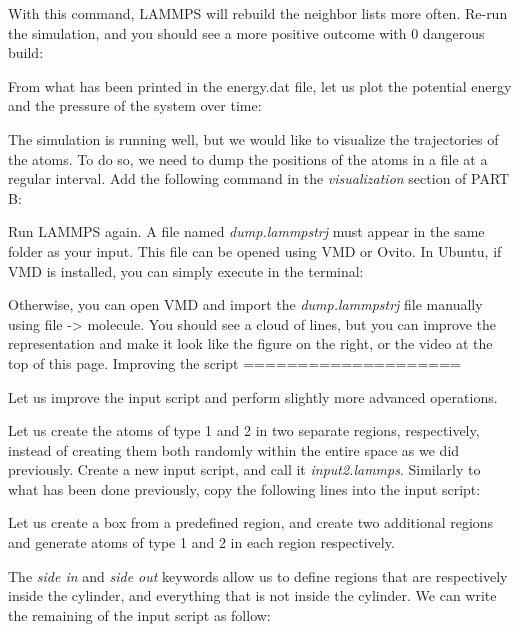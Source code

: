 \vspace{0.5cm} \noindent With this command, LAMMPS will rebuild the neighbor lists
more often. Re-run the simulation, and you should see a more
positive outcome with 0 dangerous build:

\vspace{0.5cm} \noindent From what has been printed in the energy.dat file, let us
plot the potential energy and the pressure of
the system over time:

\vspace{0.5cm} \noindent The simulation is running well, but we would like to
visualize the trajectories of the atoms. To do so, we need
to dump the positions of the atoms in a file at a regular
interval. Add the following command in the \textit{visualization}
section of PART B:

\vspace{0.5cm} \noindent Run LAMMPS again. A file named \textit{dump.lammpstrj} must appear in
the same folder as your input. This file can be opened using
VMD or Ovito. In Ubuntu, if VMD is installed, you can simply
execute in the terminal:

\vspace{0.5cm} \noindent Otherwise, you can open VMD and import the \textit{dump.lammpstrj}
file manually using file -> molecule. You should see a cloud
of lines, but you can improve the representation and make it
look like the figure on the right, or the video at the 
top of this page. 
Improving the script
====================

\vspace{0.5cm} \noindent Let us improve the input script and perform slightly more
advanced operations.

\vspace{0.5cm} \noindent Let us create the atoms of type 1 and 2 in two separate
regions, respectively, instead of creating them both randomly 
within the entire space as we did previously. Create a new input script, and call
it \textit{input2.lammps}. Similarly to what has been done previously, copy the following lines
into the input script:

\vspace{0.5cm} \noindent Let us create a box from a predefined region,
and create two additional regions and generate
atoms of type 1 and 2 in each region respectively.

\vspace{0.5cm} \noindent The \textit{side in} and \textit{side out} keywords
allow us to define regions that are respectively inside the
cylinder, and everything that is not inside the cylinder.
We can write the remaining of the input script as follow:

